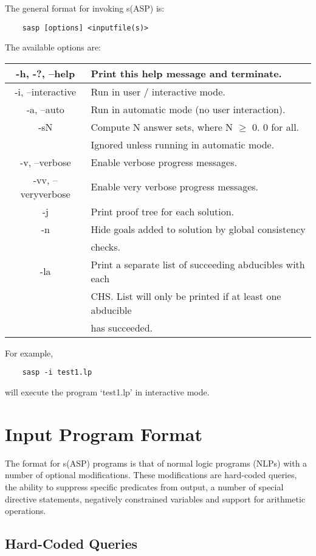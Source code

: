 \documentclass[]{article}
\begin{document}
The general format for invoking s(ASP) is:
\begin{verbatim}
    sasp [options] <inputfile(s)>
\end{verbatim}
The available options are:

\begin{tabular}{|c|l|}
	\hline 
	-h, -?, --help & Print this help message and terminate. \\ 
	\hline 
	-i, --interactive  & Run in user / interactive mode. \\ 
	\hline 
	-a, --auto & Run in automatic mode (no user interaction). \\ 
	\hline 
	-sN & Compute N answer sets, where N $\ge$ 0. 0 for all.\\
	& Ignored unless running in automatic mode. \\ 
	\hline 
	-v, --verbose & Enable verbose progress messages. \\ 
	\hline 
	-vv, --veryverbose & Enable very verbose progress messages. \\ 
	\hline 
	-j & Print proof tree for each solution. \\ 
	\hline 
	-n & Hide goals added to solution by global consistency\\
	& checks. \\ 
	\hline 
	-la & Print a separate list of succeeding abducibles with each\\
	& CHS. List will only be printed if at least one abducible\\
	& has succeeded. \\ 
	\hline 
\end{tabular}

\noindent For example,
\begin{verbatim}
    sasp -i test1.lp
\end{verbatim}
will execute the program `test1.lp' in interactive mode.


\section{Input Program Format}

The format for s(ASP) programs is that of normal logic programs (NLPs) with a
number of optional modifications. These modifications are hard-coded queries,
the ability to suppress specific predicates from output, a number of special
directive statements, negatively constrained variables and support for
arithmetic operations.


\subsection{Hard-Coded Queries}
\end{document}
